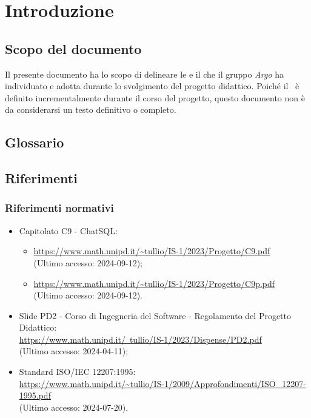\section{Introduzione}

\subsection{Scopo del documento}
\par Il presente documento ha lo scopo di delineare le  e il  che il gruppo \textit{Argo} ha individuato e adotta durante lo svolgimento del progetto didattico. Poiché il \WoW\ è definito incrementalmente durante il corso del progetto, questo documento non è da considerarsi un testo definitivo o completo.

\subsection{Glossario}
\GlossarioIntroduzione

\subsection{Riferimenti}

\subsubsection{Riferimenti normativi}
\begin{itemize}
  \item Capitolato C9 - ChatSQL:
  \begin{itemize}
    \item \href{https://www.math.unipd.it/~tullio/IS-1/2023/Progetto/C9.pdf}{https://www.math.unipd.it/\textasciitilde tullio/IS-1/2023/Progetto/C9.pdf} \\ (Ultimo accesso: 2024-09-12);
    \item \href{https://www.math.unipd.it/~tullio/IS-1/2023/Progetto/C9p.pdf}{https://www.math.unipd.it/\textasciitilde tullio/IS-1/2023/Progetto/C9p.pdf} \\ (Ultimo accesso: 2024-09-12).
  \end{itemize}
  \item Slide PD2 - Corso di Ingegneria del Software - Regolamento del Progetto Didattico: \\ \href{https://www.math.unipd.it/~tullio/IS-1/2023/Dispense/PD2.pdf}{https://www.math.unipd.it/~tullio/IS-1/2023/Dispense/PD2.pdf} \\ (Ultimo accesso: 2024-04-11);
  \item Standard ISO/IEC 12207:1995:\\ \url{https://www.math.unipd.it/~tullio/IS-1/2009/Approfondimenti/ISO_12207-1995.pdf} \\ (Ultimo accesso: 2024-07-20).
\end{itemize}

